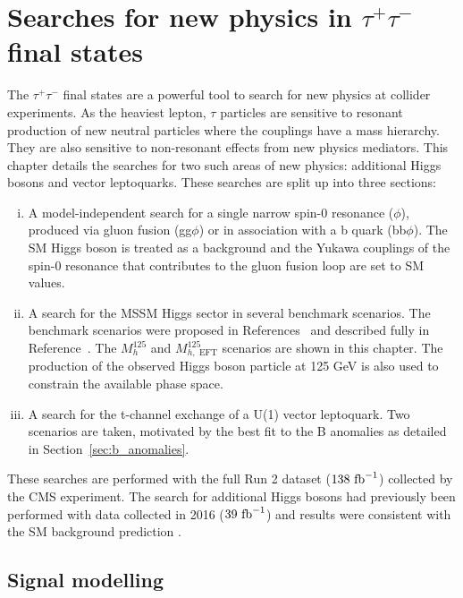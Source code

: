 \chapter{\texorpdfstring{Searches for new physics in $\tau^+\tau^-$ final states}{Search for new physics in tautau final states}}
\label{sec:bsm_H_to_tau_tau_analysis}
 
The $\tau^+\tau^-$ final states are a powerful tool to search for new physics at collider experiments. 
As the heaviest lepton, $\tau$ particles are sensitive to resonant production of new neutral particles where the couplings have a mass hierarchy.
They are also sensitive to non-resonant effects from new physics mediators. 
This chapter details the searches for two such areas of new physics: additional Higgs bosons and vector leptoquarks.
These searches are split up into three sections: 
\begin{enumerate}[i)]
  \item A model-independent search for a single narrow spin-0 resonance ($\phi$), produced via gluon fusion (gg$\phi$) or in association with a b quark (bb$\phi$). The \ac{SM} Higgs boson is treated as a background and the Yukawa couplings of the spin-0 resonance that contributes to the gluon fusion loop are set to \ac{SM} values.
   \item A search for the \ac{MSSM} Higgs sector in several benchmark scenarios. The benchmark scenarios were proposed in References~\cite{Bahl:2018zmf,Bahl:2020kwe,Bahl:2019ago} and described fully in Reference~\cite{Bagnaschi:2791954}. The $M_{h}^{125}$ and $M_{h,\text{ EFT}}^{125}$ scenarios are shown in this chapter. The production of the observed Higgs boson particle at 125 GeV is also used to constrain the available phase space.
  \item A search for the t-channel exchange of a U(1) vector leptoquark. Two scenarios are taken, motivated by the best fit to the B anomalies as detailed in Section~\ref{sec:b_anomalies}.
\end{enumerate}

These searches are performed with the full Run 2 dataset ($138 \text{ fb}^{-1}$) collected by the \ac{CMS} experiment. 
The search for additional Higgs bosons had previously been performed with data collected in 2016 ($39 \text{ fb}^{-1}$) and results were consistent with the \ac{SM} background prediction \cite{CMS_MSSM_Tau_2018}.
 
\section{Signal modelling} 
 
